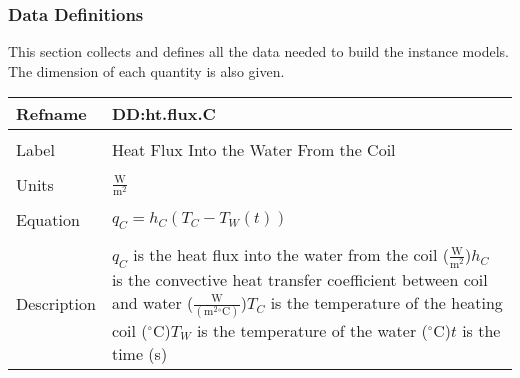 \documentclass[12pt]{article}
\begin{document}
\subsubsection{Data Definitions}
\label{Sec:DDs}
This section collects and defines all the data needed to build the instance models. The dimension of each quantity is also given.
~\newline
\noindent \begin{minipage}{\textwidth}
\begin{tabular}{p{} p{}}
\toprule \textbf{Refname} & \textbf{DD:ht.flux.C}
\label{DD:ht.flux.C}
\\ \midrule \\
Label & Heat Flux Into the Water From the Coil
\\ \midrule \\
Units & $\frac{\text{W}}{\text{m}^{2}}$
\\ \midrule \\
Equation & ${q_{C}}={h_{C}} \left({T_{C}}-{T_{W}}\left(t\right)\right)$
\\ \midrule \\
Description & ${q_{C}}$ is the heat flux into the water from the coil ($\frac{\text{W}}{\text{m}^{2}}$)\newline${h_{C}}$ is the convective heat transfer coefficient between coil and water ($\frac{\text{W}}{(\text{m}^{2}{}^{\circ}\text{C})}$)\newline${T_{C}}$ is the temperature of the heating coil (${}^{\circ}$C)\newline${T_{W}}$ is the temperature of the water (${}^{\circ}$C)\newline$t$ is the time (s)
\\ \bottomrule \end{tabular}
\end{minipage}\\
\end{document}
